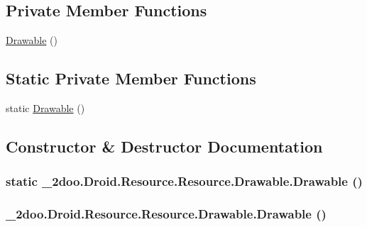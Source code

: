 \subsection*{Private Member Functions}
\begin{CompactItemize}
\item 
\hyperlink{class__2doo_1_1_droid_1_1_resource_1_1_drawable_22256bb4bcadd09709fb65ec22a3df05}{Drawable} ()
\end{CompactItemize}
\subsection*{Static Private Member Functions}
\begin{CompactItemize}
\item 
static \hyperlink{class__2doo_1_1_droid_1_1_resource_1_1_drawable_c3f8211c1e541f6f5753b7b026f20d7f}{Drawable} ()
\end{CompactItemize}


\subsection{Constructor \& Destructor Documentation}
\hypertarget{class__2doo_1_1_droid_1_1_resource_1_1_drawable_c3f8211c1e541f6f5753b7b026f20d7f}{
\subsubsection[{Drawable}]{\setlength{\rightskip}{0pt plus 5cm}static \_\-2doo.Droid.Resource.Resource.Drawable.Drawable ()}}
\label{class__2doo_1_1_droid_1_1_resource_1_1_drawable_c3f8211c1e541f6f5753b7b026f20d7f}


\hypertarget{class__2doo_1_1_droid_1_1_resource_1_1_drawable_22256bb4bcadd09709fb65ec22a3df05}{
\subsubsection[{Drawable}]{\setlength{\rightskip}{0pt plus 5cm}\_\-2doo.Droid.Resource.Resource.Drawable.Drawable ()}}
\label{class__2doo_1_1_droid_1_1_resource_1_1_drawable_22256bb4bcadd09709fb65ec22a3df05}




